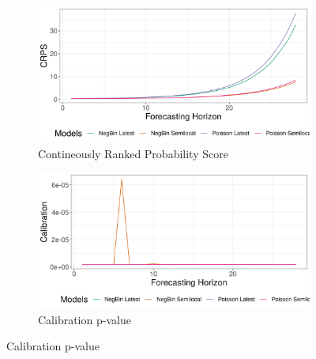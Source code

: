 \begin{figure}[H]
\begin{subfigure}{0.5\textwidth}
  \centering
  \includegraphics[width=\linewidth]{../output/Kalunguta_crps.png}  
  \caption{Contineously Ranked Probability Score}
  \label{fig:sub-first}
\end{subfigure}
\begin{subfigure}{0.5\textwidth}
  \centering
  \includegraphics[width=\linewidth]{../output/Kalunguta_calibration.png}  
  \caption{Calibration p-value}
  \label{fig:sub-second}
\end{subfigure}


\end{figure}

